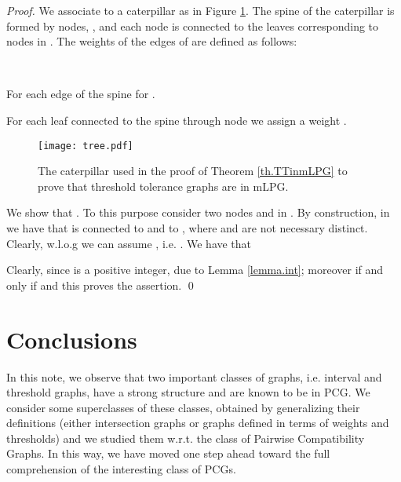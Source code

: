 \documentclass{elsarticle}
\newcommand{\DENSE}{\setlength{\labelwidth}{12pt}\setlength{\labelsep}{2pt}\setlength{\leftmargin}{\labelwidth}\addtolength{\leftmargin}{\labelsep}\setlength{\parsep}{0pt}\setlength{\itemsep}{0pt}\setlength{\topsep}{0pt}
}
\newenvironment{ditemize}{\begin{list}{~}{\DENSE}}{\end{list}}
\begin{document}
\begin{doublespace}
\begin{proof}
We associate to  a caterpillar  as in Figure \ref{fig:tree}. 
The spine of the caterpillar is formed by  nodes, , and each node  is connected to the leaves  corresponding to nodes  in . 
The weights  of the edges of  are defined as follows: 
\begin{ditemize}
\item For each edge of the spine  for .  
\item For each leaf  connected to the spine through node  we assign a weight . 
\end{ditemize}



\begin{figure}[h]
\begin{center}
\texttt{[image: tree.pdf]}
\caption{\footnotesize{The caterpillar used in the proof of Theorem \ref{th.TTinmLPG} to prove that threshold tolerance graphs are in mLPG.}}
\label{fig:tree}
\end{center}
\end{figure}

We show that . 
To this purpose consider two nodes  and  in . 
By construction, in  we have that  is connected to  and  to , where  and  are not necessary distinct. 
Clearly, w.l.o.g we can assume , i.e. . 
We have that 


Clearly,  since  is a positive integer, due to Lemma \ref{lemma.int}; moreover  if and only if   and this proves the assertion. \qed
\end{proof}


\section{Conclusions}

In this note, we observe that two important classes of graphs, i.e. interval and threshold graphs, have a strong structure and are known to be in PCG.
We consider some superclasses of these classes, obtained by generalizing their definitions (either intersection graphs or graphs defined in terms of weights and thresholds) and we studied them w.r.t. the class of Pairwise Compatibility Graphs.
In this way, we have moved one step ahead toward the full comprehension of the interesting class of PCGs.

\end{doublespace}
\end{document}
